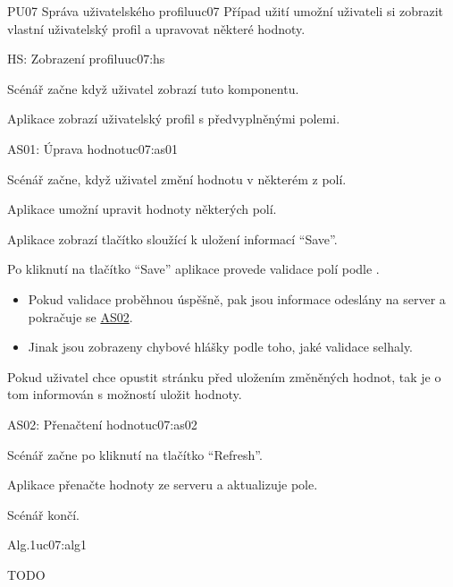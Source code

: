 \begin{usecase}{PU07 Správa uživatelského profilu}{uc07}
    Případ užití umožní uživateli si zobrazit vlastní uživatelský profil a upravovat některé hodnoty.

    \begin{scenario}{HS: Zobrazení profilu}{uc07:hs}
        \item Scénář začne když uživatel zobrazí tuto komponentu.
        \item Aplikace zobrazí uživatelský profil s předvyplněnými polemi.
    \end{scenario}

    \begin{scenario}{AS01: Úprava hodnot}{uc07:as01}
        \item Scénář začne, když uživatel změní hodnotu v některém z polí.
        \item Aplikace umožní upravit hodnoty některých polí.
        \item Aplikace zobrazí tlačítko sloužící k uložení informací \enquote{Save}.
        \item Po kliknutí na tlačítko \enquote{Save} aplikace provede validace polí podle .
        \begin{itemize}
            \item Pokud validace proběhnou úspěšně, pak jsou informace odeslány na server a pokračuje se \hyperref[uc07:as02]{AS02}.
            \item Jinak jsou zobrazeny chybové hlášky podle toho, jaké validace selhaly.
        \end{itemize}
        \item Pokud uživatel chce opustit stránku před uložením změněných hodnot, tak je o tom informován s možností uložit hodnoty.
    \end{scenario}

    \begin{scenario}{AS02: Přenačtení hodnot}{uc07:as02}
        \item Scénář začne po kliknutí na tlačítko \enquote{Refresh}.
        \item Aplikace přenačte hodnoty ze serveru a aktualizuje pole.
        \item Scénář končí.        
    \end{scenario}

    \begin{scenario}{Alg.1}{uc07:alg1}
        \item TODO
    \end{scenario}
\end{usecase}